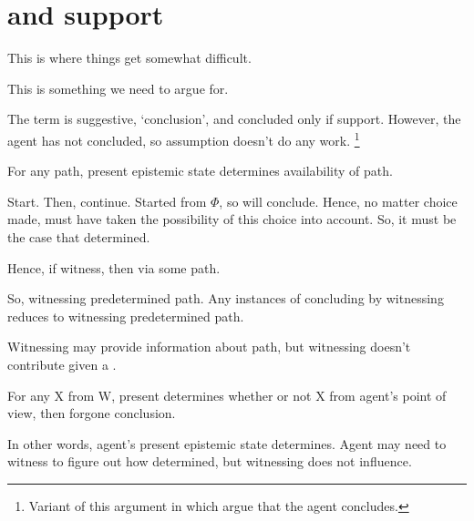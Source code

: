 \section{ and support}
\label{cha:fcs:sec:fc3-support}

\begin{note}
  This is where things get somewhat difficult.

  This is something we need to argue for.

  The term is suggestive, `conclusion', and concluded only if support.
  However, the agent has not concluded, so assumption doesn't do any work.%
  \footnote{
    Variant of this argument in which argue that the agent concludes.
  }
\end{note}

\begin{note}
  \begin{proposition}
    For any path, present epistemic state determines availability of path.
  \end{proposition}

  Start.
  Then, continue.
  Started from \(\Phi\), so will conclude.
  Hence, no matter choice made, must have taken the possibility of this choice into account.
  So, it must be the case that determined.

  Hence, if witness, then via some path.

  So, witnessing predetermined path.
  Any instances of concluding by witnessing reduces to witnessing predetermined path.

  Witnessing may provide information about path, but witnessing doesn't contribute given a \requ{}.

  For any X from W,
  present determines whether or not X from agent's point of view, then forgone conclusion.

  In other words, agent's present epistemic state determines.
  Agent may need to witness to figure out how determined, but witnessing does not influence.
\end{note}

